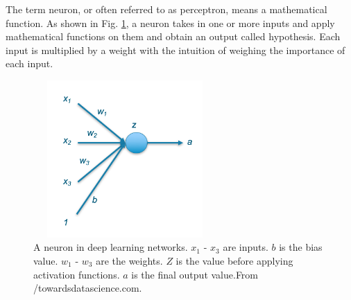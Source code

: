 The term neuron, or often referred to as perceptron, means a mathematical function. As shown in Fig. \ref{fig_neuron}, a neuron takes in one or more inputs and apply mathematical functions on them and obtain an output called hypothesis. Each input is multiplied by a weight with the intuition of weighing the importance of each input.
\begin{figure}[h!]
\begin{center}
\includegraphics[height = 6cm, width = 7cm]{img/neuron.png}
\caption[A neuron in deep learning networks]{A neuron in deep learning networks. $x_1$ - $x_3$ are inputs. $b$ is the bias value. $w_1$ - $w_3$ are the weights. $Z$ is the value before applying activation functions. $a$ is the final output value.From /towardsdatascience.com. \label{fig_neuron}}
\end{center}
\end{figure}

